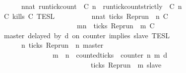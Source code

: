 \begin{isabellebody}
\ \ \ \ \ \ \ \ {\isacharbraceleft}{\isasymrho}{\isachardot}\ {\isasymforall}n{\isacharcolon}{\isacharcolon}nat{\isachardot}\ {\isacharparenleft}run{\isacharunderscore}tick{\isacharunderscore}count\ {\isasymrho}\ C\ n{\isacharparenright}\ {\isasymle}\ {\isacharparenleft}run{\isacharunderscore}tick{\isacharunderscore}count{\isacharunderscore}strictly\ {\isasymrho}\ C\ n{\isacharparenright}{\isacharbraceright}{\isacartoucheclose}\isanewline
\ \ %
\isanewline
\ \ {\isacharbar}\ {\isacartoucheopen}{\isasymlbrakk}\ C\ kills\ C\ {\isasymrbrakk}\isactrlsub T\isactrlsub E\isactrlsub S\isactrlsub L\ {\isacharequal}\isanewline
\ \ \ \ \ \ \ \ {\isacharbraceleft}{\isasymrho}{\isachardot}\ {\isasymforall}n{\isacharcolon}{\isacharcolon}nat{\isachardot}\ ticks\ {\isacharparenleft}{\isacharparenleft}Rep{\isacharunderscore}run\ {\isasymrho}{\isacharparenright}\ n\ C\isanewline
\ \ \ \ \ \ \ \ \ \ \ \ \ \ \ \ \ \ \ \ \ \ \ \ {\isasymlongrightarrow}\ {\isacharparenleft}{\isasymforall}m{\isasymge}n{\isachardot}\ {\isasymnot}\ ticks\ {\isacharparenleft}{\isacharparenleft}Rep{\isacharunderscore}run\ {\isasymrho}{\isacharparenright}\ m\ C\isanewline
\ \ {\isacharbar}\ {\isacartoucheopen}{\isasymlbrakk}\ master\ delayed\ by\ d\ on\ counter\ implies\ slave\ {\isasymrbrakk}\isactrlsub T\isactrlsub E\isactrlsub S\isactrlsub L\ {\isacharequal}\isanewline
\ \ \ \ %
\isanewline
\ \ \ \ \ \ \ \ {\isacharbraceleft}{\isasymrho}{\isachardot}\ {\isasymforall}n{\isachardot}\ ticks\ {\isacharparenleft}{\isacharparenleft}Rep{\isacharunderscore}run\ {\isasymrho}{\isacharparenright}\ n\ master{\isacharparenright}\ {\isasymlongrightarrow}\isanewline
\ \ \ \ \ \ \ \ \ \ \ \ \ \ \ \ \ {\isacharparenleft}\isanewline
\ \ \ \ \ \ \ \ \ \ \ \ \ \ \ \ \ \ {\isasymforall}m\ {\isasymge}\ n{\isachardot}\ \ counted{\isacharunderscore}ticks\ {\isasymrho}\ counter\ n\ m\ d\isanewline
\ \ \ \ \ \ \ \ \ \ \ \ \ \ \ \ \ \ \ \ \ \ \ \ \ \ \ \ {\isasymlongrightarrow}\ ticks\ {\isacharparenleft}{\isacharparenleft}Rep{\isacharunderscore}run\ {\isasymrho}{\isacharparenright}\ m\ slave{\isacharparenright}\isanewline

\end{isabellebody}
